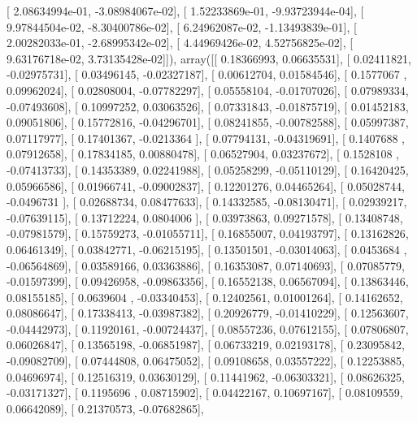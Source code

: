 \documentclass{article}
\begin{document}
       [  2.08634994e-01,  -3.08984067e-02],
       [  1.52233869e-01,  -9.93723944e-04],
       [  9.97844504e-02,  -8.30400786e-02],
       [  6.24962087e-02,  -1.13493839e-01],
       [  2.00282033e-01,  -2.68995342e-02],
       [  4.44969426e-02,   4.52756825e-02],
       [  9.63176718e-02,   3.73135428e-02]]), array([[ 0.18366993,  0.06635531],
       [ 0.02411821, -0.02975731],
       [ 0.03496145, -0.02327187],
       [ 0.00612704,  0.01584546],
       [ 0.1577067 ,  0.09962024],
       [ 0.02808004, -0.07782297],
       [ 0.05558104, -0.01707026],
       [ 0.07989334, -0.07493608],
       [ 0.10997252,  0.03063526],
       [ 0.07331843, -0.01875719],
       [ 0.01452183,  0.09051806],
       [ 0.15772816, -0.04296701],
       [ 0.08241855, -0.00782588],
       [ 0.05997387,  0.07117977],
       [ 0.17401367, -0.0213364 ],
       [ 0.07794131, -0.04319691],
       [ 0.1407688 ,  0.07912658],
       [ 0.17834185,  0.00880478],
       [ 0.06527904,  0.03237672],
       [ 0.1528108 , -0.07413733],
       [ 0.14353389,  0.02241988],
       [ 0.05258299, -0.05110129],
       [ 0.16420425,  0.05966586],
       [ 0.01966741, -0.09002837],
       [ 0.12201276,  0.04465264],
       [ 0.05028744, -0.0496731 ],
       [ 0.02688734,  0.08477633],
       [ 0.14332585, -0.08130471],
       [ 0.02939217, -0.07639115],
       [ 0.13712224,  0.0804006 ],
       [ 0.03973863,  0.09271578],
       [ 0.13408748, -0.07981579],
       [ 0.15759273, -0.01055711],
       [ 0.16855007,  0.04193797],
       [ 0.13162826,  0.06461349],
       [ 0.03842771, -0.06215195],
       [ 0.13501501, -0.03014063],
       [ 0.0453684 , -0.06564869],
       [ 0.03589166,  0.03363886],
       [ 0.16353087,  0.07140693],
       [ 0.07085779, -0.01597399],
       [ 0.09426958, -0.09863356],
       [ 0.16552138,  0.06567094],
       [ 0.13863446,  0.08155185],
       [ 0.0639604 , -0.03340453],
       [ 0.12402561,  0.01001264],
       [ 0.14162652,  0.08086647],
       [ 0.17338413, -0.03987382],
       [ 0.20926779, -0.01410229],
       [ 0.12563607, -0.04442973],
       [ 0.11920161, -0.00724437],
       [ 0.08557236,  0.07612155],
       [ 0.07806807,  0.06026847],
       [ 0.13565198, -0.06851987],
       [ 0.06733219,  0.02193178],
       [ 0.23095842, -0.09082709],
       [ 0.07444808,  0.06475052],
       [ 0.09108658,  0.03557222],
       [ 0.12253885,  0.04696974],
       [ 0.12516319,  0.03630129],
       [ 0.11441962, -0.06303321],
       [ 0.08626325, -0.03171327],
       [ 0.1195696 ,  0.08715902],
       [ 0.04422167,  0.10697167],
       [ 0.08109559,  0.06642089],
       [ 0.21370573, -0.07682865],
\end{document}
